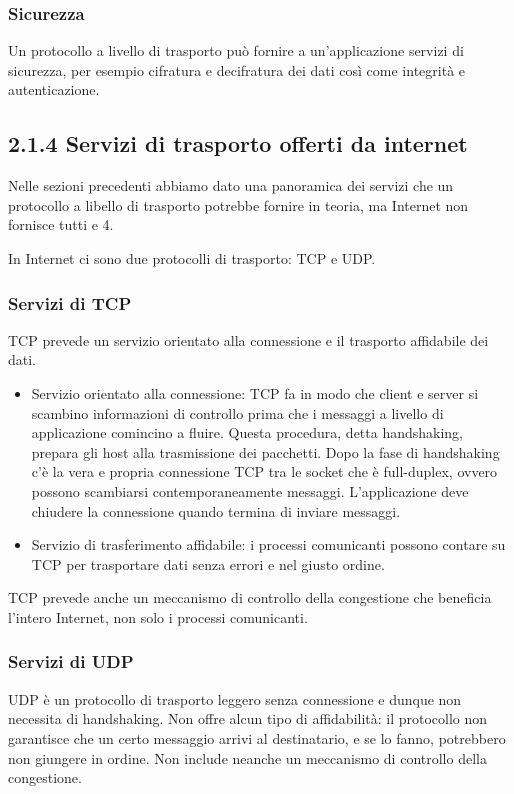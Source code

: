 \documentclass{book}
\begin{document}
\subsubsection*{Sicurezza}
Un protocollo a livello di trasporto può fornire a un'applicazione servizi di sicurezza, per esempio cifratura e decifratura dei dati così come integrità e autenticazione.

\subsection*{2.1.4 Servizi di trasporto offerti da internet}
Nelle sezioni precedenti abbiamo dato una panoramica dei servizi che un protocollo a libello di trasporto potrebbe fornire in teoria, ma Internet non fornisce tutti e 4.

In Internet ci sono due protocolli di trasporto: TCP e UDP.

\subsubsection*{Servizi di TCP}
TCP prevede un servizio orientato alla connessione e il trasporto affidabile dei dati.

\begin{itemize}
	\item Servizio orientato alla connessione: TCP fa in modo che client e server si scambino informazioni di controllo prima che i messaggi a livello di applicazione comincino a fluire. Questa procedura, detta handshaking, prepara gli host alla trasmissione dei pacchetti. Dopo la fase di handshaking c'è la vera e propria connessione TCP tra le socket che è full-duplex, ovvero possono scambiarsi contemporaneamente messaggi. L'applicazione deve chiudere la connessione quando termina di inviare messaggi.
	
	\item Servizio di trasferimento affidabile: i processi comunicanti possono contare su TCP per trasportare dati senza errori e nel giusto ordine.
\end{itemize}

TCP prevede anche un meccanismo di controllo della congestione che beneficia l'intero Internet, non solo i processi comunicanti.

\subsubsection*{Servizi di UDP}
UDP è un protocollo di trasporto leggero senza connessione e dunque non necessita di handshaking. Non offre alcun tipo di affidabilità: il protocollo non garantisce che un certo messaggio arrivi al destinatario, e se lo fanno, potrebbero non giungere in ordine. Non include neanche un meccanismo di controllo della congestione.
\end{document}

